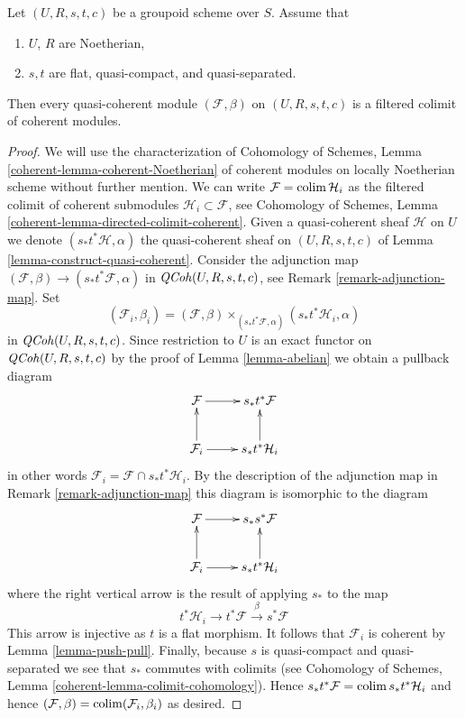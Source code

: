 \begin{lemma}
\label{lemma-colimit-coherent}
Let $(U, R, s, t, c)$ be a groupoid scheme over $S$.
Assume that
\begin{enumerate}
\item $U$, $R$ are Noetherian,
\item $s, t$ are flat, quasi-compact, and quasi-separated.
\end{enumerate}
Then every quasi-coherent module $(\mathcal{F}, \beta)$ on $(U, R, s, t, c)$
is a filtered colimit of coherent modules.
\end{lemma}

\begin{proof}
We will use the characterization of Cohomology of Schemes, Lemma
\ref{coherent-lemma-coherent-Noetherian} of coherent modules on locally
Noetherian scheme without further mention. We can write
$\mathcal{F} = \mathop{\mathrm{colim}}\nolimits \mathcal{H}_i$ as the filtered colimit
of coherent submodules $\mathcal{H}_i \subset \mathcal{F}$, see
Cohomology of Schemes, Lemma \ref{coherent-lemma-directed-colimit-coherent}.
Given a quasi-coherent sheaf $\mathcal{H}$ on $U$ we denote
$(s_*t^*\mathcal{H}, \alpha)$ the quasi-coherent sheaf on $(U, R, s, t, c)$ of
Lemma \ref{lemma-construct-quasi-coherent}. Consider the adjunction map
$(\mathcal{F}, \beta) \to (s_*t^*\mathcal{F}, \alpha)$ in
$\mathit{QCoh}(U, R, s, t, c)$, see Remark \ref{remark-adjunction-map}.
Set
$$
(\mathcal{F}_i, \beta_i) =
(\mathcal{F}, \beta)
\times_{(s_*t^*\mathcal{F}, \alpha)}
(s_*t^*\mathcal{H}_i, \alpha)
$$
in $\mathit{QCoh}(U, R, s, t, c)$. Since restriction to $U$ is an exact functor
on $\mathit{QCoh}(U, R, s, t, c)$  by the proof of Lemma \ref{lemma-abelian}
we obtain a pullback diagram
$$
\xymatrix{
\mathcal{F} \ar[r] & s_*t^*\mathcal{F} \\
\mathcal{F}_i \ar[r] \ar[u] & s_*t^*\mathcal{H}_i \ar[u]
}
$$
in other words $\mathcal{F}_i = \mathcal{F} \cap s_*t^*\mathcal{H}_i$.
By the description of the adjunction map in Remark \ref{remark-adjunction-map}
this diagram is isomorphic to the diagram
$$
\xymatrix{
\mathcal{F} \ar[r] & s_*s^*\mathcal{F} \\
\mathcal{F}_i \ar[r] \ar[u] & s_*t^*\mathcal{H}_i \ar[u]
}
$$
where the right vertical arrow is the result of applying $s_*$ to the map
$$
t^*\mathcal{H}_i \to t^*\mathcal{F} \xrightarrow{\beta} s^*\mathcal{F}
$$
This arrow is injective as $t$ is a flat morphism. It follows that
$\mathcal{F}_i$ is coherent by Lemma \ref{lemma-push-pull}.
Finally, because $s$ is quasi-compact and quasi-separated we see that
$s_*$ commutes with colimits (see
Cohomology of Schemes, Lemma \ref{coherent-lemma-colimit-cohomology}).
Hence $s_*t^*\mathcal{F} = \mathop{\mathrm{colim}}\nolimits s_*t^*\mathcal{H}_i$ and hence
$(\mathcal{F}, \beta) = \mathop{\mathrm{colim}}\nolimits (\mathcal{F}_i, \beta_i)$ as desired.
\end{proof}

